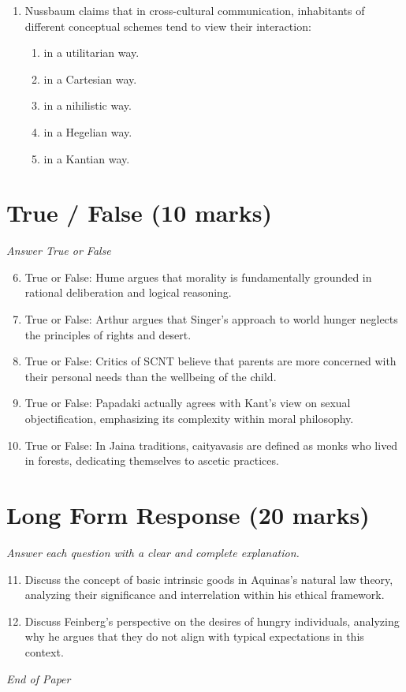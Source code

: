 \documentclass[12pt]{article}
\begin{document}
\begin{enumerate}[label=\arabic*.]
\begin{enumerate}[label=(\alph*)]
\end{enumerate}
\item Nussbaum claims that in cross-cultural communication, inhabitants of different conceptual schemes tend to view their interaction:
\begin{enumerate}[label=(\alph*)]
    \item in a utilitarian way.
    \item in a Cartesian way.
    \item in a nihilistic way.
    \item in a Hegelian way.
    \item in a Kantian way.
\end{enumerate}
\end{enumerate}

\section*{True / False (10 marks)}
\textit{Answer True or False}
\begin{enumerate}[label=\arabic*.]
\setcounter{enumi}{5}
\item True or False: Hume argues that morality is fundamentally grounded in rational deliberation and logical reasoning.
\item True or False: Arthur argues that Singer's approach to world hunger neglects the principles of rights and desert.
\item True or False: Critics of SCNT believe that parents are more concerned with their personal needs than the wellbeing of the child.
\item True or False: Papadaki actually agrees with Kant's view on sexual objectification, emphasizing its complexity within moral philosophy.
\item True or False: In Jaina traditions, caityavasis are defined as monks who lived in forests, dedicating themselves to ascetic practices.
\end{enumerate}

\section*{Long Form Response (20 marks)}
\textit{Answer each question with a clear and complete explanation.}
\begin{enumerate}[label=\arabic*.]
\setcounter{enumi}{10}
\item Discuss the concept of basic intrinsic goods in Aquinas's natural law theory, analyzing their significance and interrelation within his ethical framework.
\item Discuss Feinberg's perspective on the desires of hungry individuals, analyzing why he argues that they do not align with typical expectations in this context.
\end{enumerate}

\vfill
\noindent\textit{End of Paper}
\end{document}

